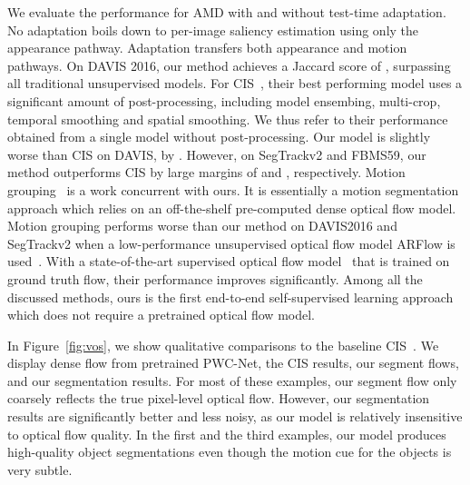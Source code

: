 We evaluate the performance for AMD with and without test-time adaptation. No adaptation boils down to per-image saliency estimation using only the appearance pathway. Adaptation transfers both appearance and motion pathways.
On DAVIS 2016, our method achieves a Jaccard score of , surpassing all traditional unsupervised models. 
For CIS~\cite{yang2019unsupervised}, their best performing model uses a significant amount of post-processing, including model ensembing, multi-crop, temporal smoothing and spatial smoothing.
We thus refer to their performance obtained from a single model without post-processing.
Our model is slightly worse than CIS on DAVIS, by .
However, on SegTrackv2 and FBMS59, our method outperforms CIS by large margins of  and , respectively.
Motion grouping~\cite{yang2021self} is a work concurrent with ours.
It is essentially  a motion segmentation approach which relies on an off-the-shelf pre-computed dense optical flow model.
Motion grouping performs worse than our method on DAVIS2016 and SegTrackv2 when a low-performance unsupervised optical flow model ARFlow is used~\cite{liu2020learning}.
With a state-of-the-art supervised optical flow model~\cite{teed2020raft} that is trained on ground truth flow, their performance improves significantly.
Among all the discussed methods, ours is the first end-to-end self-supervised learning approach which does not require a pretrained optical flow model.


In Figure~\ref{fig:vos}, we show qualitative comparisons to the baseline CIS~\cite{yang2019unsupervised}. We display dense flow from pretrained PWC-Net, the CIS results, our segment flows, and our segmentation results. For most of these examples, our segment flow only coarsely reflects the true pixel-level optical flow. However, our segmentation results are significantly better and less noisy, as our model is relatively insensitive to optical flow quality.
In the first and the third examples, our model produces high-quality object segmentations even though the motion cue for the objects is very subtle.



